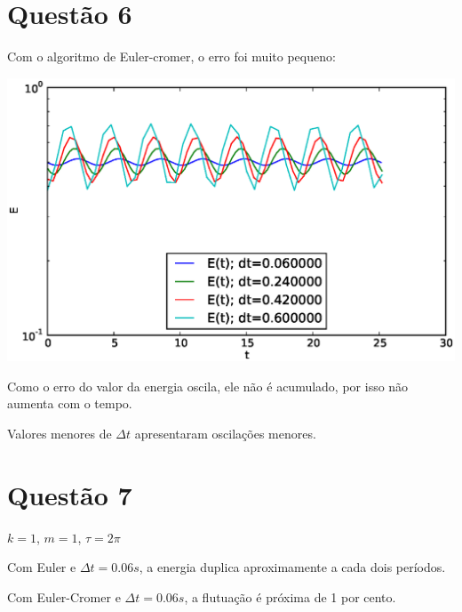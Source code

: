 \documentclass[brazilian,12pt,a4paper,final]{article}
\begin{document}
\section*{Questão 6} 
Com o algoritmo de Euler-cromer, o erro foi muito pequeno:

\includegraphics[scale=0.75]{quest6.eps}

Como o erro do valor da energia oscila, ele não é acumulado, 
por isso não aumenta com o tempo.

Valores menores de $\Delta t$ apresentaram oscilações menores.

\section*{Questão 7} 
$k=1$, $m=1$, $\tau=2\pi$

Com Euler e $\Delta t = 0.06s$, a energia duplica 
aproximamente a cada dois períodos.

Com Euler-Cromer e $\Delta t = 0.06s$, a flutuação é próxima de 1 por cento.
\end{document}
